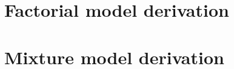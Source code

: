 \documentclass{bioinfo}
\begin{document}
\appendix
\section{Factorial model derivation}

\section{Mixture model derivation}
\end{document}
